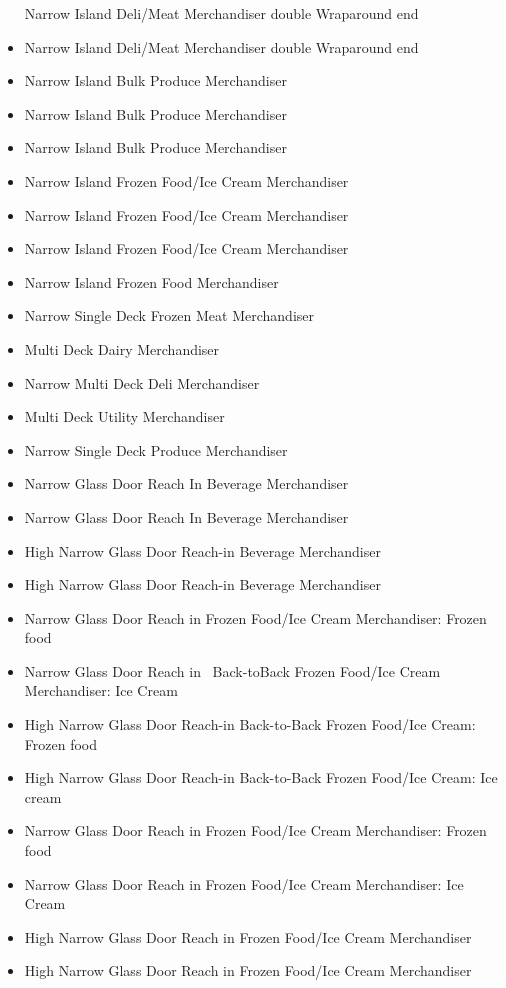 \begin{itemize}
  Narrow Island Deli/Meat Merchandiser double Wraparound end
\item
  Narrow Island Deli/Meat Merchandiser double Wraparound end
\item
  Narrow Island Bulk Produce Merchandiser
\item
  Narrow Island Bulk Produce Merchandiser
\item
  Narrow Island Bulk Produce Merchandiser
\item
  Narrow Island Frozen Food/Ice Cream Merchandiser
\item
  Narrow Island Frozen Food/Ice Cream Merchandiser
\item
  Narrow Island Frozen Food/Ice Cream Merchandiser
\item
  Narrow Island Frozen Food Merchandiser
\item
  Narrow Single Deck Frozen Meat Merchandiser
\item
  Multi Deck Dairy Merchandiser
\item
  Narrow Multi Deck Deli Merchandiser
\item
  Multi Deck Utility Merchandiser
\item
  Narrow Single Deck Produce Merchandiser
\item
  Narrow Glass Door Reach In Beverage Merchandiser
\item
  Narrow Glass Door Reach In Beverage Merchandiser
\item
  High Narrow Glass Door Reach-in Beverage Merchandiser
\item
  High Narrow Glass Door Reach-in Beverage Merchandiser
\item
  Narrow Glass Door Reach in Frozen Food/Ice Cream Merchandiser: Frozen food
\item
  Narrow Glass Door Reach in~ Back-toBack Frozen Food/Ice Cream Merchandiser: Ice Cream
\item
  High Narrow Glass Door Reach-in Back-to-Back Frozen Food/Ice Cream: Frozen food
\item
  High Narrow Glass Door Reach-in Back-to-Back Frozen Food/Ice Cream: Ice cream
\item
  Narrow Glass Door Reach in Frozen Food/Ice Cream Merchandiser: Frozen food
\item
  Narrow Glass Door Reach in Frozen Food/Ice Cream Merchandiser: Ice Cream
\item
  High Narrow Glass Door Reach in Frozen Food/Ice Cream Merchandiser
\item
  High Narrow Glass Door Reach in Frozen Food/Ice Cream Merchandiser

\end{itemize}
